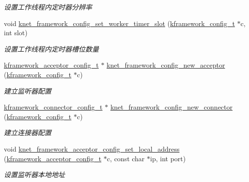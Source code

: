 \begin{DoxyCompactItemize}
\begin{DoxyCompactList}\small\item\em 设置工作线程内定时器分辨率 \end{DoxyCompactList}\item 
void \hyperlink{a00115_gae0c5bc540a44a88d64390845744f736f_gae0c5bc540a44a88d64390845744f736f}{knet\+\_\+framework\+\_\+config\+\_\+set\+\_\+worker\+\_\+timer\+\_\+slot} (\hyperlink{a00056_adeaf952e0f0887507ff836385bf54874_adeaf952e0f0887507ff836385bf54874}{kframework\+\_\+config\+\_\+t} $\ast$c, int slot)
\begin{DoxyCompactList}\small\item\em 设置工作线程内定时器槽位数量 \end{DoxyCompactList}\item 
\hyperlink{a00056_a39c993eb450173e4fde04498d757f9b6_a39c993eb450173e4fde04498d757f9b6}{kframework\+\_\+acceptor\+\_\+config\+\_\+t} $\ast$ \hyperlink{a00115_ga681a7f8e071507cc60f8f56043fe4443_ga681a7f8e071507cc60f8f56043fe4443}{knet\+\_\+framework\+\_\+config\+\_\+new\+\_\+acceptor} (\hyperlink{a00056_adeaf952e0f0887507ff836385bf54874_adeaf952e0f0887507ff836385bf54874}{kframework\+\_\+config\+\_\+t} $\ast$c)
\begin{DoxyCompactList}\small\item\em 建立监听器配置 \end{DoxyCompactList}\item 
\hyperlink{a00056_a44d3033eba5a4fd784a741700a7a2521_a44d3033eba5a4fd784a741700a7a2521}{kframework\+\_\+connector\+\_\+config\+\_\+t} $\ast$ \hyperlink{a00115_ga135342b1a0a31db4d614ee96a76d3e46_ga135342b1a0a31db4d614ee96a76d3e46}{knet\+\_\+framework\+\_\+config\+\_\+new\+\_\+connector} (\hyperlink{a00056_adeaf952e0f0887507ff836385bf54874_adeaf952e0f0887507ff836385bf54874}{kframework\+\_\+config\+\_\+t} $\ast$c)
\begin{DoxyCompactList}\small\item\em 建立连接器配置 \end{DoxyCompactList}\item 
void \hyperlink{a00115_gae13e628b69405ef9a338980da9475b53_gae13e628b69405ef9a338980da9475b53}{knet\+\_\+framework\+\_\+acceptor\+\_\+config\+\_\+set\+\_\+local\+\_\+address} (\hyperlink{a00056_a39c993eb450173e4fde04498d757f9b6_a39c993eb450173e4fde04498d757f9b6}{kframework\+\_\+acceptor\+\_\+config\+\_\+t} $\ast$c, const char $\ast$ip, int port)
\begin{DoxyCompactList}\small\item\em 设置监听器本地地址 \end{DoxyCompactList}\item 

\end{DoxyCompactItemize}
